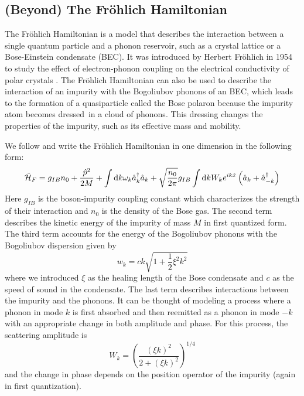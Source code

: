 \subsection{(Beyond) The Fröhlich Hamiltonian}\label{(Beyond) The Fröhlich Hamiltonian}
The Fröhlich Hamiltonian is a model that describes the interaction between a single quantum particle and a phonon reservoir, such as a crystal lattice or a Bose-Einstein condensate (BEC). It was introduced by Herbert Fröhlich in 1954 to study the effect of electron-phonon coupling on the electrical conductivity of polar crystals \cite{doi:10.1080/00018735400101213}. The Fröhlich Hamiltonian can also be used to describe the interaction of an impurity with the Bogoliubov phonons of an BEC, which leads to the formation of a quasiparticle called the Bose polaron because the impurity atom becomes \grqq dressed\grqq\ in a cloud of phonons. This dressing changes the properties of the impurity, such as its effective mass and mobility.\par 
We follow \cite{Grusdt_2017} and write the Fröhlich Hamiltonian in one dimension in the following form:
\begin{equation}\label{Fröhlich}
\hat{\mathcal{H}}_F = g_{IB}n_0+\frac{\hat p^2}{2M}+\int\mathrm d k\omega_{ k}\hat a^\dagger_{ k}\hat a_{ k}+\sqrt{\frac{n_0}{2\pi}}g_{IB}\int\mathrm d k W_k e^{ik\hat x}\left(\hat a_{ k}+\hat a^\dagger_{- k}\right)
\end{equation}
Here $g_{IB}$ is the boson-impurity coupling constant which characterizes the strength of their interaction and $n_0$ is the density of the Bose gas. The second term describes the kinetic energy of the impurity of mass $M$ in first quantized form. The third term accounts for the energy of the Bogoliubov phonons with the Bogoliubov dispersion given by 
\begin{equation}\label{bog_disp}
w_k=ck\sqrt{1+\frac12\xi^2k^2}
\end{equation}
where we introduced $\xi$ as the healing length of the Bose condensate and $c$ as the speed of sound in the condensate. The last term describes interactions between the impurity and the phonons. It can be thought of modeling a process where a phonon in mode $k$ is first absorbed and then reemitted as a phonon in mode $-k$ with an appropriate change in both amplitude and phase. For this process, the scattering amplitude is
\begin{equation}\label{W_k_def}
W_k = \left(\frac{(\xi k)^2}{2+(\xi k)^2}\right)^{1/4}
\end{equation}
and the change in phase depends on the position operator of the impurity (again in first quantization).\par
